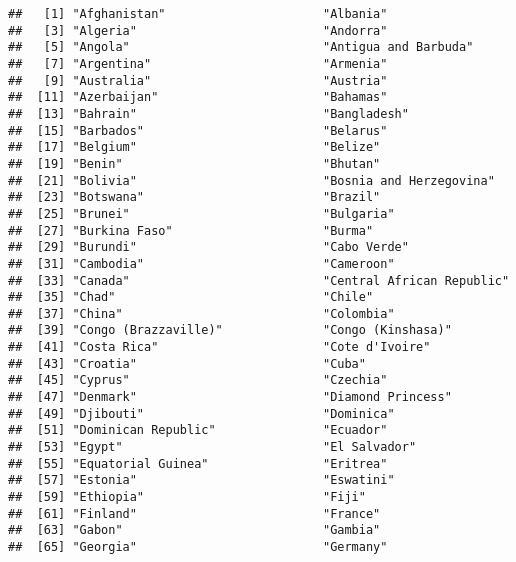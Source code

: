 \documentclass[]{article}
\begin{document}
\begin{verbatim}
##   [1] "Afghanistan"                      "Albania"                         
##   [3] "Algeria"                          "Andorra"                         
##   [5] "Angola"                           "Antigua and Barbuda"             
##   [7] "Argentina"                        "Armenia"                         
##   [9] "Australia"                        "Austria"                         
##  [11] "Azerbaijan"                       "Bahamas"                         
##  [13] "Bahrain"                          "Bangladesh"                      
##  [15] "Barbados"                         "Belarus"                         
##  [17] "Belgium"                          "Belize"                          
##  [19] "Benin"                            "Bhutan"                          
##  [21] "Bolivia"                          "Bosnia and Herzegovina"          
##  [23] "Botswana"                         "Brazil"                          
##  [25] "Brunei"                           "Bulgaria"                        
##  [27] "Burkina Faso"                     "Burma"                           
##  [29] "Burundi"                          "Cabo Verde"                      
##  [31] "Cambodia"                         "Cameroon"                        
##  [33] "Canada"                           "Central African Republic"        
##  [35] "Chad"                             "Chile"                           
##  [37] "China"                            "Colombia"                        
##  [39] "Congo (Brazzaville)"              "Congo (Kinshasa)"                
##  [41] "Costa Rica"                       "Cote d'Ivoire"                   
##  [43] "Croatia"                          "Cuba"                            
##  [45] "Cyprus"                           "Czechia"                         
##  [47] "Denmark"                          "Diamond Princess"                
##  [49] "Djibouti"                         "Dominica"                        
##  [51] "Dominican Republic"               "Ecuador"                         
##  [53] "Egypt"                            "El Salvador"                     
##  [55] "Equatorial Guinea"                "Eritrea"                         
##  [57] "Estonia"                          "Eswatini"                        
##  [59] "Ethiopia"                         "Fiji"                            
##  [61] "Finland"                          "France"                          
##  [63] "Gabon"                            "Gambia"                          
##  [65] "Georgia"                          "Germany"                         

\end{verbatim}
\end{document}
